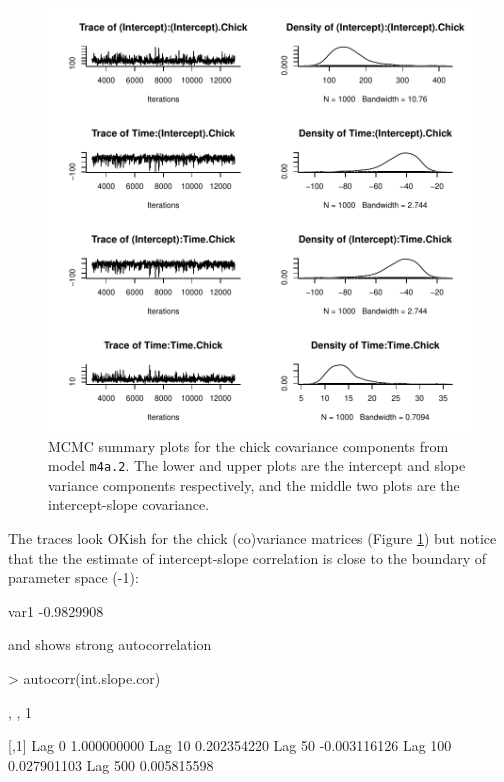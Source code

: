 \documentclass{article}
\begin{document}
\begin{figure}[!h]
\begin{center}
\includegraphics{Lecture4-017}
\end{center}
\caption{MCMC summary plots for the chick covariance components from model \texttt{m4a.2}. The lower and upper plots are the intercept and slope variance components respectively, and the middle two plots are the intercept-slope covariance.}
\label{RR2VCV-fig}
\end{figure}

The traces look OKish for the chick (co)variance matrices (Figure \ref{RR2VCV-fig}) but notice that the the estimate of intercept-slope correlation is close to the boundary of parameter space (-1):

\begin{Schunk}
\begin{Soutput}
      var1 
-0.9829908 
\end{Soutput}
\end{Schunk}

and shows strong autocorrelation

\begin{Schunk}
\begin{Sinput}
> autocorr(int.slope.cor)
\end{Sinput}
\begin{Soutput}
, , 1

                [,1]
Lag 0    1.000000000
Lag 10   0.202354220
Lag 50  -0.003116126
Lag 100  0.027901103
Lag 500  0.005815598
\end{Soutput}
\end{Schunk}
\end{document}
